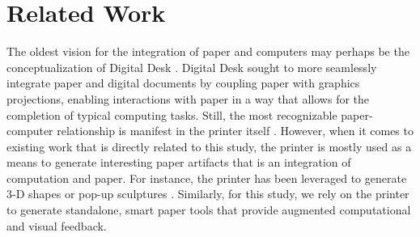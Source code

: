 \documentclass{sig-alternate}
\begin{document}



\section{Related Work}
The oldest vision for the integration of paper and computers may perhaps be the conceptualization of Digital Desk \cite{wellner1993}. Digital Desk sought to more seamlessly integrate paper and digital documents by coupling paper with graphics projections, enabling interactions with paper in a way that allows for the completion of typical computing tasks. Still, the most recognizable paper-computer relationship is manifest in the printer itself \cite{qi2010}. However, when it comes to existing work that is directly related to this study, the printer is mostly used as a means to generate interesting paper artifacts that is an integration of computation and paper. For instance, the printer has been leveraged to generate 3-D shapes or pop-up sculptures \cite{eisenberg1997, hendrix2005}. Similarly, for this study, we rely on the printer to generate standalone, smart paper tools that provide augmented computational and visual feedback.
\end{document}
